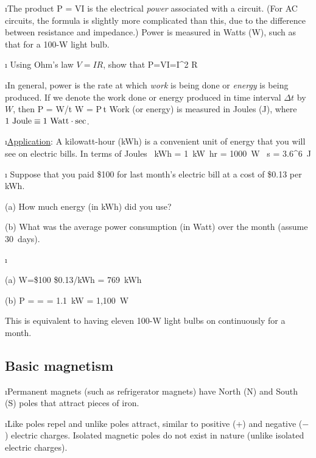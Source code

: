 \i The product 
%
\be
P = VI
\ee
%
is the electrical {\em power} associated with a circuit.
(For AC circuits, the formula is slightly more complicated than this,
due to the difference between resistance and impedance.)
Power is measured in Watts (W), such as that for a 100-W light bulb.

\i \exer
Using Ohm's law $V=IR$, show that
%
\be
P=VI=I^2 R 
\ee

\i In general, power is the rate at which {\em work} is being 
done or {\em energy} is being produced. 
If we denote the work done or energy produced in 
time interval $\Delta t$ by $W$, then
%
\be
P = W/\Delta t
\quad
W = P\,\Delta t
\ee
%
Work (or energy) is measured in Joules (J), where 
$1~{\rm Joule} \equiv 1~{\rm Watt}\cdot{\rm sec}$.

\i \underline{Application}: 
A kilowatt-hour (kWh) is a convenient unit of 
energy that you will see on electric bills.
In terms of Joules
%
~{\rm kWh}
= 1~{\rm kW}~{\rm hr}
= 1000~{\rm W} ~{\rm s}
= 3.6^6~{\rm J}
\ee

\i \exer 
Suppose that you paid \$100 for last month's electric bill
at a cost of \$0.13 per kWh.

(a) How much energy (in kWh) did you use? 

(b) What was the average power consumption (in Watt) over 
the month (assume 30~days).

\i \ans

(a) 
\be 
W=\$100 \div \$0.13/{\rm kWh} = 769~{\rm kWh}
\ee 

(b)
\be
P =  
=  
= 1.1~{\rm kW} 
= 1,100~{\rm W}
\ee

This is equivalent to having eleven 100-W light bulbs 
on continuously for a month.
 
\ei

%
\subsection{Basic magnetism}

\bi

\i Permanent magnets (such as refrigerator magnets) have 
North (N) and South (S) poles that attract pieces of iron.

\i Like poles repel and unlike poles attract,
similar to positive (+) and negative ($-$) electric charges.
Isolated magnetic poles do not exist in nature (unlike isolated
electric charges).

